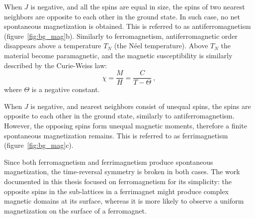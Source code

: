 When $J$ is negative, and all the spins are equal in size, the spins of two nearest neighbors are opposite to each other in the ground state. In such case, no net spontaneous magnetization is obtained. This is referred to as antiferromagnetism (figure~\ref{fig:bg_mag}b). Similarly to ferromagnetism, antiferromagnetic order disappears above a temperature $T_N$ (the N\'eel temperature). Above $T_N$ the material become paramagnetic, and the magnetic susceptibility is similarly described by the Curie-Weiss law:%
\begin{equation}%
    \chi = \frac{M}{H} = \frac{C}{T - \Theta}~,%
\end{equation}%
where $\Theta$ is a negative constant.

When $J$ is negative, and nearest neighbors consist of unequal spins, the spins are opposite to each other in the ground state, similarly to antiferromagnetism. However, the opposing spins form unequal magnetic moments, therefore a finite spontaneous magnetization remains. This is referred to as ferrimagnetism (figure~\ref{fig:bg_mag}c).

Since both ferromagnetism and ferrimagnetism produce spontaneous magnetization, the time-reversal symmetry is broken in both cases. The work documented in this thesis focused on ferromagnetism for its simplicity: the opposite spins in the sub-lattices in a ferrimagnet might produce complex magnetic domains at its surface, whereas it is more likely to observe a uniform magnetization on the surface of a ferromagnet.